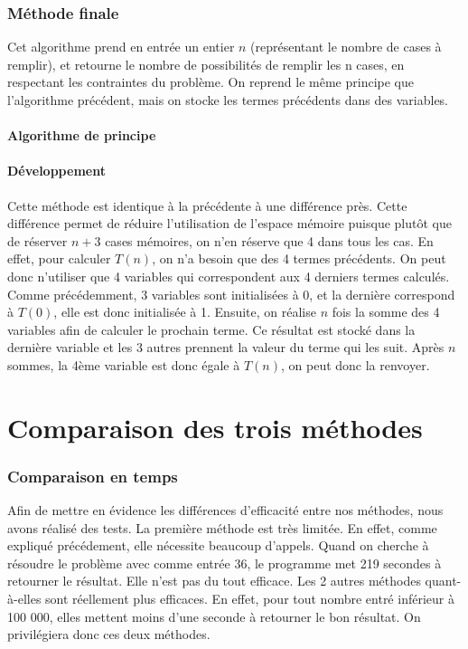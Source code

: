 \documentclass{article}
\begin{document}
\section{Méthode finale}

Cet algorithme prend en entrée un entier $n$ (représentant le nombre de cases à remplir), et retourne le nombre de possibilités de remplir les n cases, en respectant les contraintes du problème. On reprend le même principe que l'algorithme précédent, mais on stocke les termes précédents dans des variables.

\subsection{Algorithme de principe}



\subsection{Développement}
Cette méthode est identique à la précédente à une différence près. Cette différence permet de réduire l'utilisation de l'espace mémoire puisque plutôt que de réserver $n+3$ cases mémoires, on n'en réserve que 4 dans tous les cas. En effet, pour calculer $T(n)$, on n'a besoin que des 4 termes précédents. On peut donc n'utiliser que 4 variables qui correspondent aux 4 derniers termes calculés. Comme précédemment, 3 variables sont initialisées à 0, et la dernière correspond à $T(0)$, elle est donc initialisée à 1. Ensuite, on réalise $n$ fois la somme des 4 variables afin de calculer le prochain terme. Ce résultat est stocké dans la dernière variable et les 3 autres prennent la valeur du terme qui les suit. Après $n$ sommes, la 4ème variable est donc égale à $T(n)$, on peut donc la renvoyer.
\newpage
\part{Comparaison des trois méthodes}
\section{Comparaison en temps}
Afin de mettre en évidence les différences d'efficacité entre nos méthodes, nous avons réalisé des tests. La première méthode est très limitée. En effet, comme expliqué précédement, elle nécessite beaucoup d'appels. Quand on cherche à résoudre le problème avec comme entrée 36, le programme met 219 secondes à retourner le résultat. Elle n'est pas du tout efficace. Les 2 autres méthodes quant-à-elles sont réellement plus efficaces. En effet, pour tout nombre entré inférieur à 100 000, elles mettent moins d'une seconde à retourner le bon résultat. On privilégiera donc ces deux méthodes.
\end{document}
